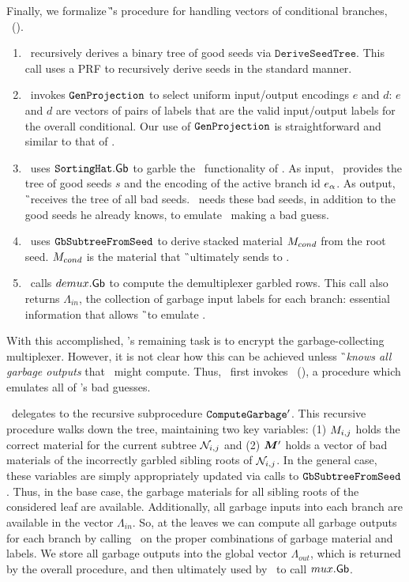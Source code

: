 Finally, we formalize \G's procedure for handling vectors of
conditional branches, \gbcond~().
%
\begin{enumerate}
  \item \gbcond\ recursively derives a binary tree of
good seeds via $\mathtt{DeriveSeedTree}$. This call uses a PRF
to recursively derive seeds in the standard manner.
%
\item \gbcond\ invokes $\mathtt{GenProjection}$ to select uniform input/output
encodings $e$ and $d$: $e$ and $d$ are vectors of pairs of labels that are
the valid input/output labels for the overall conditional.
Our use of $\mathtt{GenProjection}$ is straightforward and similar to that of
\HK.
%
\item \gbcond\ uses $\mathtt{SortingHat}.\textsf{Gb}$ to garble the \gadget\
  functionality of .
  As input, \gbcond\ provides the tree of good seeds $s$ and the encoding
  of the active branch id $e_{\alpha}$. As output, \G\ receives the tree
  of all bad seeds.
  \gbcond\ needs these bad seeds, in addition to the good seeds he
  already knows, to emulate \E\ making a bad guess.
%
\item \gbcond\ uses $\mathtt{GbSubtreeFromSeed}$ to derive stacked material
$M_{cond}$ from the root seed.
$M_{cond}$ is the material that \G\ ultimately sends to \E.
%
\item \gbcond\ calls $demux.\textsf{Gb}$ to compute the demultiplexer garbled
  rows.  This call also returns $\Lambda_{in}$, the collection of garbage input labels for each
  branch: essential information that allows \G\ to emulate \E.
\end{enumerate}
With this accomplished, \gbcond's remaining task is to encrypt the
garbage-collecting multiplexer.
However, it is not clear how
this can be achieved unless \G\ \emph{knows all garbage outputs} that
\E\ might compute.
%
Thus, \gbcond\ first invokes \computegarbage\
(), a procedure which
emulates all of \E's bad guesses.

\computegarbage\ delegates to the recursive subprocedure
$\mathtt{ComputeGarbage}'$. This recursive procedure walks down the tree,
maintaining two key variables: (1) $M_{i,j}$ holds the correct
material for the current subtree $\mathtt{\cal N}_{i,j}$ and (2) $\vec{\mat}'$
holds a vector of bad materials of the incorrectly garbled sibling
roots of $\mathtt{\cal N}_{i,j}$.
%
In the general case, these variables are simply appropriately updated
via calls to $\mathtt{GbSubtreeFromSeed}$.
Thus,
in the base case, the garbage materials for all sibling roots of the
considered leaf are available.
Additionally, all garbage inputs into each branch are available in the
vector $\Lambda_{in}$.
%
So, at the leaves we can compute all garbage outputs for each
branch by calling \gEv\ on the proper combinations of garbage material
and labels.
%
We store all garbage outputs into the global vector $\Lambda_{out}$, which is
returned by the overall procedure, and then ultimately used by
\gbcond\ to call $mux.\textsf{Gb}$.
